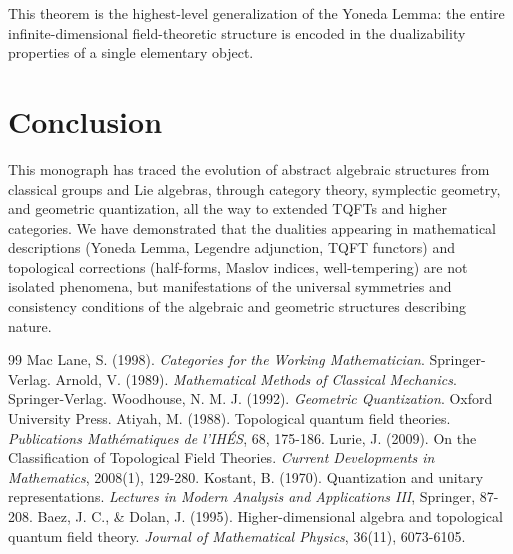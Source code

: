 \documentclass[11pt,a4paper,oneside]{book}
\theoremstyle{definition}
\theoremstyle{plain}
\begin{document}
This theorem is the highest-level generalization of the Yoneda Lemma: the entire infinite-dimensional field-theoretic structure is encoded in the dualizability properties of a single elementary object.


\backmatter

\chapter{Conclusion}
This monograph has traced the evolution of abstract algebraic structures from classical groups and Lie algebras, through category theory, symplectic geometry, and geometric quantization, all the way to extended TQFTs and higher categories. We have demonstrated that the dualities appearing in mathematical descriptions (Yoneda Lemma, Legendre adjunction, TQFT functors) and topological corrections (half-forms, Maslov indices, well-tempering) are not isolated phenomena, but manifestations of the universal symmetries and consistency conditions of the algebraic and geometric structures describing nature.

\begin{thebibliography}{99}
 Mac Lane, S. (1998). \textit{Categories for the Working Mathematician}. Springer-Verlag.
 Arnold, V. (1989). \textit{Mathematical Methods of Classical Mechanics}. Springer-Verlag.
 Woodhouse, N. M. J. (1992). \textit{Geometric Quantization}. Oxford University Press.
 Atiyah, M. (1988). Topological quantum field theories. \textit{Publications Mathématiques de l'IHÉS}, 68, 175-186.
 Lurie, J. (2009). On the Classification of Topological Field Theories. \textit{Current Developments in Mathematics}, 2008(1), 129-280.
 Kostant, B. (1970). Quantization and unitary representations. \textit{Lectures in Modern Analysis and Applications III}, Springer, 87-208.
 Baez, J. C., \& Dolan, J. (1995). Higher-dimensional algebra and topological quantum field theory. \textit{Journal of Mathematical Physics}, 36(11), 6073-6105.
\end{thebibliography}
\end{document}

